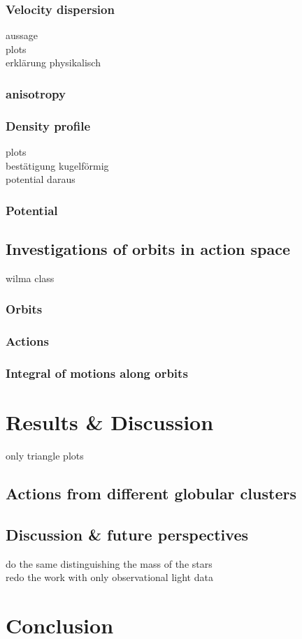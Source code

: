 \documentclass[a4paper,12pt,abstracton]{scrartcl}
\begin{document}
\subsubsection{Velocity dispersion}
aussage\\
plots\\
erklärung physikalisch
\subsubsection{anisotropy}
\subsubsection{Density profile}
plots\\
bestätigung kugelförmig\\
potential daraus
\subsubsection{Potential}

\subsection{Investigations of orbits in action space}
wilma class 
\subsubsection{Orbits}
\subsubsection{Actions}
\subsubsection{Integral of motions along orbits}
\newpage
\section{Results \& Discussion}
only triangle plots

\subsection{Actions from different globular clusters}
\subsection{Discussion \& future perspectives}
do the same distinguishing the mass of the stars\\
redo the work with only observational light data
\newpage
\section{Conclusion}
\end{document}
